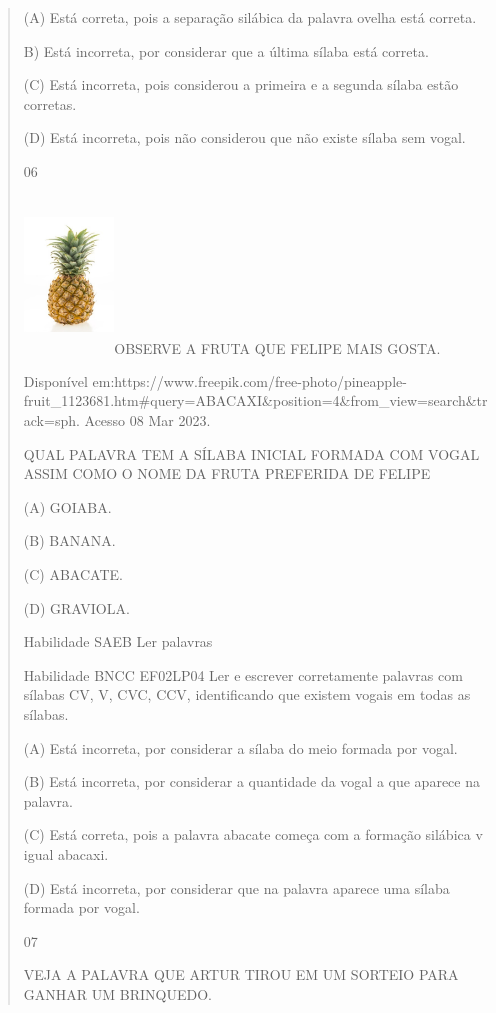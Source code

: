 {{{{\begin{verse}
{{\begin{escolha}
{{{{{(A) Está correta, pois a separação silábica da palavra ovelha está
correta.

B) Está incorreta, por considerar que a última sílaba está correta.

(C) Está incorreta, pois considerou a primeira e a segunda sílaba estão
corretas.

(D) Está incorreta, pois não considerou que não existe sílaba sem vogal.

\num{06}

\includegraphics[width=0.94236in,height=1.64306in]{media/image143.jpeg}OBSERVE
A FRUTA QUE FELIPE MAIS GOSTA.

Disponível
em:https://www.freepik.com/free-photo/pineapple-fruit\_1123681.htm\#query=ABACAXI\&position=4\&from\_view=search\&track=sph.
Acesso 08 Mar 2023.

\protect\hypertarget{_Hlk129270648}{}{}QUAL PALAVRA TEM A SÍLABA INICIAL
FORMADA COM VOGAL ASSIM COMO O NOME DA FRUTA PREFERIDA DE FELIPE

(A) GOIABA.

(B) BANANA.

(C) ABACATE.

(D) GRAVIOLA.

Habilidade SAEB Ler palavras

Habilidade BNCC EF02LP04 Ler e escrever corretamente palavras com
sílabas CV, V, CVC, CCV, identificando que existem vogais em todas as
sílabas.

(A) Está incorreta, por considerar a sílaba do meio formada por vogal.

(B) Está incorreta, por considerar a quantidade da vogal a que aparece
na palavra.

(C) Está correta, pois a palavra abacate começa com a formação silábica
v igual abacaxi.

(D) Está incorreta, por considerar que na palavra aparece uma sílaba
formada por vogal.

\num{07}

VEJA A PALAVRA QUE ARTUR TIROU EM UM SORTEIO PARA GANHAR UM BRINQUEDO.

}}}}}
\end{escolha}}}
\end{verse}}}}}
